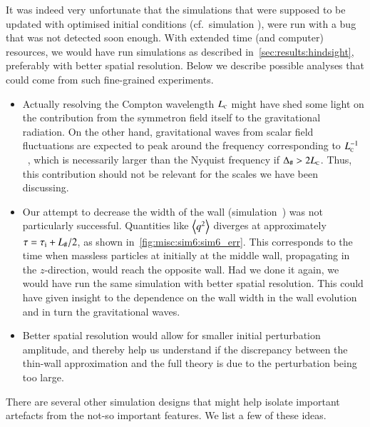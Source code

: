     It was indeed very unfortunate that the simulations that were supposed to be updated with optimised initial conditions (cf.~simulation ), were run with a bug that was not detected soon enough. With extended time (and computer) resources, we would have run simulations as described in~\cref{sec:results:hindsight}, preferably with better spatial resolution. Below we describe possible analyses that could come from such fine-grained experiments.
    \begin{itemize}
        \item Actually resolving the Compton wavelength $L_{\text{\tiny{C}}}$ might have shed some light on the contribution from the symmetron field itself to the gravitational radiation. On the other hand, gravitational waves from scalar field fluctuations are expected to peak around the frequency corresponding to $L_{\text{\tiny{C}}}^{-1}$~\citep{kawasakiStudyGravitationalRadiation2011}, which is necessarily larger than the Nyquist frequency if $\Delta_\# > 2L_{\text{\tiny{C}}}$. Thus, this contribution should not be relevant for the scales we have been discussing.
        \item Our attempt to decrease the width of the wall (simulation~) was not particularly successful. Quantities like $\left\langle{q^2}\right\rangle$ diverges at approximately $\tau=\tau_\mathrm{i}+L_\#/2$, as shown in~\cref{fig:misc:sim6:sim6_err}. This corresponds to the time when massless particles at initially at the middle wall, propagating in the $z$-direction, would reach the opposite wall. 
        Had we done it again, we would have run the same simulation with better spatial resolution. This could have given insight to the dependence on the wall width in the wall evolution and in turn the gravitational waves.
        \item Better spatial resolution would allow for smaller initial perturbation amplitude, and thereby help us understand if the discrepancy between the thin-wall approximation and the full theory is due to the perturbation being too large.
    \end{itemize}
    There are several other simulation designs that might help isolate important artefacts from the not-so important features. We list a few of these ideas.
